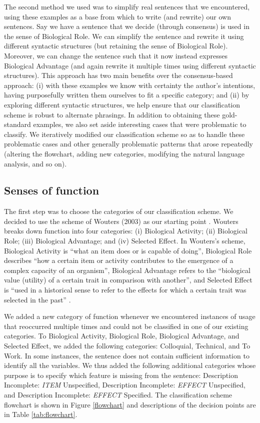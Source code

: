 \documentclass{article}
\begin{document}
The second method we used was to simplify real sentences that we encountered, using these examples as a base from which to write (and rewrite) our own sentences.
Say we have a sentence that we decide (through consensus) is used in the sense of Biological Role.
We can simplify the sentence and rewrite it using different syntactic structures (but retaining the sense of Biological Role).
Moreover, we can change the sentence such that it now instead expresses Biological Advantage (and again rewrite it multiple times using different syntactic structures).
This approach has two main benefits over the consensus-based approach: (i) with these examples we know with certainty the author's intentions, having purposefully written them ourselves to fit a specific category; and (ii) by exploring different syntactic structures, we help ensure that our classification scheme is robust to alternate phrasings.
In addition to obtaining these gold-standard examples, we also set aside interesting cases that were problematic to classify.
We iteratively modified our classification scheme so as to handle these problematic cases and other generally problematic patterns that arose repeatedly (altering the flowchart, adding new categories, modifying the natural language analysis, and so on).

\subsection{Senses of function}
\label{sec:senses-function}

The first step was to choose the categories of our classification scheme.
We decided to use the scheme of Wouters (2003) as our starting point \cite{wouters2003}.
Wouters breaks down function into four categories: (i) Biological Activity; (ii) Biological Role; (iii) Biological Advantage; and (iv) Selected Effect.
In Wouters's scheme, Biological Activity is ``what an item does or is capable of doing'', Biological Role describes ``how a certain item or activity contributes to the emergence of a complex capacity of an organism'', Biological Advantage refers to the ``biological value (utility) of a certain trait in comparison with another'', and Selected Effect is ``used in a historical sense to refer to the effects for which a certain trait was selected in the past'' \cite{wouters2003}.

We added a new category of function whenever we encountered instances of usage that reoccurred multiple times and could not be classified in one of our existing categories.
To Biological Activity, Biological Role, Biological Advantage, and Selected Effect, we added the following categories: Colloquial, Technical, and To Work.
In some instances, the sentence does not contain sufficient information to identify all the variables.
We thus added the following additional categories whose purpose is to specify which feature is missing from the sentence: Description Incomplete: \emph{ITEM} Unspecified, Description Incomplete: \emph{EFFECT} Unspecified, and Description Incomplete: \emph{EFFECT} Specified.
The classification scheme flowchart is shown in Figure \ref{flowchart} and descriptions of the decision points are in Table \ref{tab:flowchart}.
\end{document}
